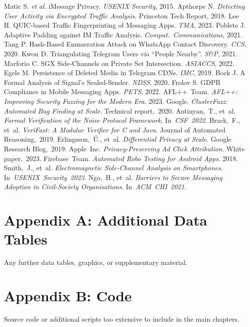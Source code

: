 \documentclass[a4paper,12pt]{report}
\begin{document}
\begin{thebibliography}{99}
 Matic S. \emph{et al.} iMessage Privacy. \textit{USENIX Security}, 2015.
 Apthorpe N. \textit{Detecting User Activity via Encrypted Traffic Analysis}. Princeton Tech Report, 2018.
 Lee H. QUIC-based Traffic Fingerprinting of Messaging Apps. \textit{TMA}, 2023.
 Poblete J. Adaptive Padding against IM Traffic Analysis. \textit{Comput.\ Communications}, 2021.
 Tang P. Hash-Based Enumeration Attack on WhatsApp Contact Discovery. \textit{CCS}, 2020.
 Kwon D. Triangulating Telegram Users via “People Nearby”. \textit{S\&P}, 2021.
 Marforio C. SGX Side-Channels on Private Set Intersection. \textit{ASIACCS}, 2022.
 Egele M. Persistence of Deleted Media in Telegram CDNs. \textit{IMC}, 2019.
 Bock J. A Formal Analysis of Signal’s Sealed-Sender. \textit{NDSS}, 2020.
 Frolov S. GDPR Compliance in Mobile Messaging Apps. \textit{PETS}, 2022.
 AFL++ Team. \emph{AFL++: Improving Security Fuzzing for the Modern Era}. 2023.
 Google. \emph{ClusterFuzz: Automated Bug Finding at Scale}. Technical report, 2020.
 Antinyan, T., et al. \emph{Formal Verification of the Noise Protocol Framework}. In \textit{CSF 2022}.
 Brack, F., et al. \emph{VeriFast: A Modular Verifier for C and Java}. Journal of Automated Reasoning, 2019.
 Erlingsson, Ú., et al. \emph{Differential Privacy at Scale}. Google Research Blog, 2019.
 Apple Inc. \emph{Privacy‑Preserving Ad Click Attribution}. White paper, 2023.
 Firebase Team. \emph{Automated Robo Testing for Android Apps}. 2018.
 Smith, J., et al. \emph{Electromagnetic Side‑Channel Analysis on Smartphones}. In \textit{USENIX Security 2023}.
 Ngo, H., et al. \emph{Barriers to Secure Messaging Adoption in Civil‑Society Organisations}. In \textit{ACM CHI 2021}.
\end{thebibliography}
\clearpage

\appendix

\chapter{Appendix A: Additional Data Tables}
Any further data tables, graphics, or supplementary material.

\chapter{Appendix B: Code}
Source code or additional scripts too extensive to include in the main chapters.
\end{document}
